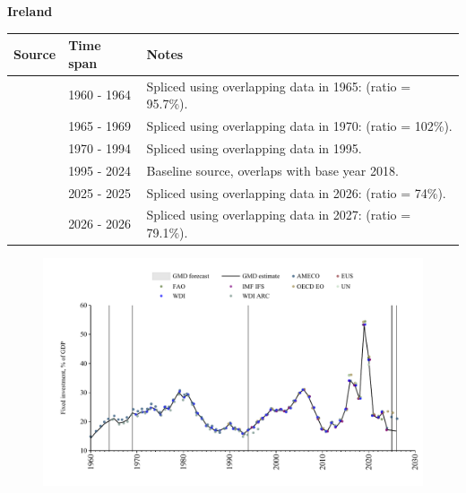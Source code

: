 \documentclass[12pt,a4paper,landscape]{article}
\begin{document}
\begin{adjustbox}{max totalsize={\paperwidth}{\paperheight},center}
\begin{minipage}[t][\textheight][t]{\textwidth}
\vspace*{0.5cm}
{}
\begin{center}
{\Large\bfseries Ireland}
\end{center}
\vspace{0.5cm}
\begin{table}[H]
\centering
\small
\begin{tabular}{|l|l|l|}
\hline
\textbf{Source} & \textbf{Time span} & \textbf{Notes} \\
\hline
\rowcolor{white}\cite{AMECO}& 1960 - 1964 &Spliced using overlapping data in 1965: (ratio = 95.7\%).\\
\rowcolor{lightgray}\cite{WDI_ARC}& 1965 - 1969 &Spliced using overlapping data in 1970: (ratio = 102\%).\\
\rowcolor{white}\cite{WDI}& 1970 - 1994 &Spliced using overlapping data in 1995.\\
\rowcolor{lightgray}\cite{EUS}& 1995 - 2024 &Baseline source, overlaps with base year 2018.\\
\rowcolor{white}\cite{OECD_EO}& 2025 - 2025 &Spliced using overlapping data in 2026: (ratio = 74\%).\\
\rowcolor{lightgray}\cite{AMECO}& 2026 - 2026 &Spliced using overlapping data in 2027: (ratio = 79.1\%).\\
\hline
\end{tabular}
\end{table}
\begin{figure}[H]
\centering
\includegraphics[width=\textwidth,height=0.6\textheight,keepaspectratio]{graphs/IRL_finv_GDP.pdf}
\end{figure}
\end{minipage}
\end{adjustbox}
\end{document}
